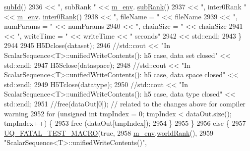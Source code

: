 \begin{DoxyCode}
      \hyperlink{class_q_u_e_s_o_1_1_base_environment_a6ae3174897a9b3a4c85fa18da5d4c16f}{subId}()
2936                                         << \textcolor{stringliteral}{", subRank "}        << \hyperlink{class_q_u_e_s_o_1_1_scalar_sequence_a71618cd6351b29361b437af68447a4c8}{m\_env}.
      \hyperlink{class_q_u_e_s_o_1_1_base_environment_a172d52f993f1322ed45aaddf71518dbb}{subRank}()
2937                                         << \textcolor{stringliteral}{", inter0Rank "}     << \hyperlink{class_q_u_e_s_o_1_1_scalar_sequence_a71618cd6351b29361b437af68447a4c8}{m\_env}.
      \hyperlink{class_q_u_e_s_o_1_1_base_environment_ae106b5bb8a80b655b88b3a26b1e7c185}{inter0Rank}()
2938                                         << \textcolor{stringliteral}{", fileName = "}     << fileName
2939                                         << \textcolor{stringliteral}{", numParams = "}    << numParams
2940                                         << \textcolor{stringliteral}{", chainSize = "}    << chainSize
2941                                         << \textcolor{stringliteral}{", writeTime = "}    << writeTime << \textcolor{stringliteral}{" seconds"}
2942                                         << std::endl;
2943               \}
2944 
2945               H5Dclose(dataset);
2946               \textcolor{comment}{//std::cout << "In ScalarSequence<T>::unifiedWriteContents(): h5 case, data set closed" <<
       std::endl;}
2947               H5Sclose(dataspace);
2948               \textcolor{comment}{//std::cout << "In ScalarSequence<T>::unifiedWriteContents(): h5 case, data space closed" <<
       std::endl;}
2949               H5Tclose(datatype);
2950               \textcolor{comment}{//std::cout << "In ScalarSequence<T>::unifiedWriteContents(): h5 case, data type closed" <<
       std::endl;}
2951               \textcolor{comment}{//free(dataOut[0]); // related to the changes above for compiler warning}
2952               \textcolor{keywordflow}{for} (\textcolor{keywordtype}{unsigned} \textcolor{keywordtype}{int} tmpIndex = 0; tmpIndex < dataOut.size(); tmpIndex++) \{
2953                 free (dataOut[tmpIndex]);
2954               \}
2955             \}
2956             \textcolor{keywordflow}{else} \{
2957               \hyperlink{_defines_8h_a56d63d18d0a6d45757de47fcc06f574d}{UQ\_FATAL\_TEST\_MACRO}(\textcolor{keyword}{true},
2958                                   \hyperlink{class_q_u_e_s_o_1_1_scalar_sequence_a71618cd6351b29361b437af68447a4c8}{m\_env}.\hyperlink{class_q_u_e_s_o_1_1_base_environment_a78b57112bbd0e6dd0e8afec00b40ffa7}{worldRank}(),
2959                                   \textcolor{stringliteral}{"ScalarSequence<T>::unifiedWriteContents()"},

\end{DoxyCode}
